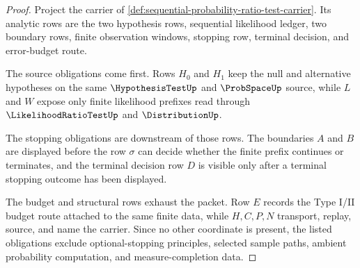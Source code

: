 \begin{proof}
Project the carrier of \autoref{def:sequential-probability-ratio-test-carrier}. Its analytic rows are the two hypothesis rows, sequential likelihood ledger, two boundary rows, finite observation windows, stopping row, terminal decision, and error-budget route.

The source obligations come first. Rows $H_0$ and $H_1$ keep the null and alternative hypotheses on the same $\HypothesisTestUp$ and $\ProbSpaceUp$ source, while $L$ and $W$ expose only finite likelihood prefixes read through $\LikelihoodRatioTestUp$ and $\DistributionUp$.

The stopping obligations are downstream of those rows. The boundaries $A$ and $B$ are displayed before the row $\sigma$ can decide whether the finite prefix continues or terminates, and the terminal decision row $D$ is visible only after a terminal stopping outcome has been displayed.

The budget and structural rows exhaust the packet. Row $E$ records the Type I/II budget route attached to the same finite data, while $H,C,P,N$ transport, replay, source, and name the carrier. Since no other coordinate is present, the listed obligations exclude optional-stopping principles, selected sample paths, ambient probability computation, and measure-completion data.
\end{proof}


